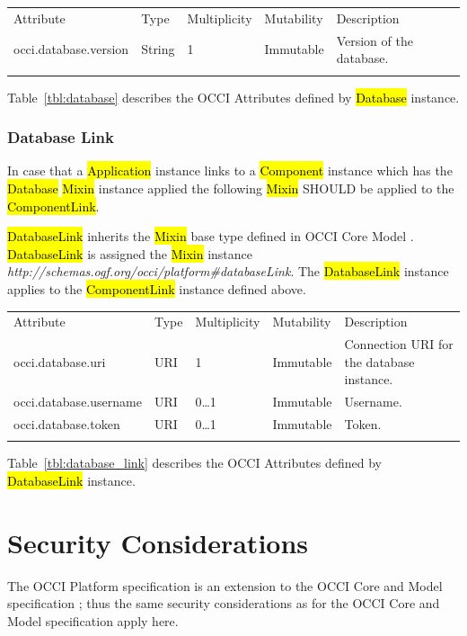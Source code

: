 \documentclass[10pt,a4paper]{article}
\begin{document}
{
	\begin{tabular}{lp{2.5cm}p{1cm}lp{5cm}}
	\toprule
	Attribute&Type&Multi\-plicity&Mutability&Description\\
	\colrule
	occi.database.version & String & 1 & Immutable & Version of the database.\\
	\botrule
	\end{tabular}
}

Table~\ref{tbl:database} describes the OCCI Attributes defined by \hl{Database} instance. 

\subsubsection{Database Link}
In case that a \hl{Application} instance links to a \hl{Component} instance which has the \hl{Database} \hl{Mixin} instance applied the following \hl{Mixin} SHOULD be applied to the \hl{ComponentLink}.

\hl{DatabaseLink} inherits the \hl{Mixin} base type defined in OCCI Core Model \cite{occi:core}. \hl{DatabaseLink} is assigned the \hl{Mixin} instance \textit{http://schemas.ogf.org/occi/platform\#databaseLink}. The \hl{DatabaseLink} instance applies to the \hl{ComponentLink} instance defined above.

{
	\begin{tabular}{lp{2.5cm}p{1cm}lp{5cm}}
	\toprule
	Attribute&Type&Multi\-plicity&Mutability&Description\\
	\colrule
	occi.database.uri & URI & 1 & Immutable & Connection URI for the database instance.\\
	occi.database.username & URI & 0\ldots1 & Immutable & Username.\\
	occi.database.token & URI & 0\ldots1 & Immutable & Token.\\
	\botrule
	\end{tabular}
}

Table~\ref{tbl:database_link} describes the OCCI Attributes defined by \hl{DatabaseLink} instance. 


\section{Security Considerations}
The OCCI Platform specification is an extension to the OCCI Core
and Model specification \cite{occi:core}; thus the same security
considerations as for the OCCI Core and Model specification apply
here.
\end{document}
